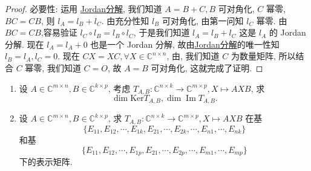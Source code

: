 \documentclass[../../main.tex]{subfiles}
\begin{document}
\begin{proof}
{\heiti 必要性: }运用 \hyperref[theorem:Jordan-Chevalley分解]{Jordan分解}, 我们知道 $A = B + C, B$ 可对角化, $C$ 幂零, $BC = CB$, 则 $l_A = l_B + l_C$. 由充分性知 $l_B$ 可对角化, 由第一问知 $l_C$ 幂零. 由$BC=CB$,容易验证 $l_C \circ  l_B = l_B \circ  l_C$, 于是我们知道 $l_A = l_B + l_C$ 这是 $l_A$ 的 Jordan 分解. 现在 $l_A = l_A + 0$ 也是一个 Jordan 分解, 故由\hyperref[theorem:Jordan-Chevalley分解]{Jordan分解}的唯一性知$l_B = l_A, l_C = 0$. 现在 $CX = XC, \forall X \in \mathbb{C}^{n \times n}$, 由, 我们知道 $C$ 为数量矩阵, 所以结合 $C$ 幂零, 我们知道 $C = O$, 故 $A = B$ 可对角化, 这就完成了证明.


\end{proof}

\begin{example}
\begin{enumerate}
\item 设 $A \in \mathbb{C}^{m \times n}, B \in \mathbb{C}^{k \times p}$, 考虑 $T_{A,B} : \mathbb{C}^{n \times k} \to \mathbb{C}^{m \times p}, X \mapsto AXB$, 求
$$\dim \mathrm{Ker} T_{A,B}, \dim \operatorname{Im} T_{A,B}.$$

\item 设 $A \in \mathbb{C}^{m \times n}, B \in \mathbb{C}^{k \times p}$, 求 $T_{A,B} : \mathbb{C}^{n \times k} \to \mathbb{C}^{m \times p}, X \mapsto AXB$ 在基
$$\{E_{11}, E_{12}, \cdots, E_{1k}, E_{21}, \cdots, E_{2k}, \cdots, E_{n1}, \cdots, E_{nk}\}$$
和基
$$\{E_{11}, E_{12}, \cdots, E_{1p}, E_{21}, \cdots, E_{2p}, \cdots, E_{m1}, \cdots, E_{mp}\}$$
下的表示矩阵.
\end{enumerate}
\end{example}
\end{document}
